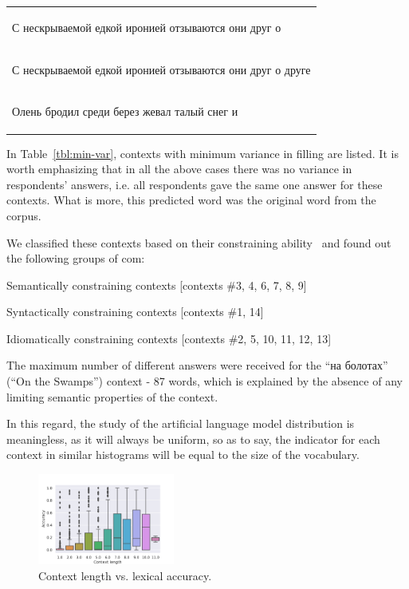\documentclass[a4paper]{article}
\begin{document}
\begin{table}
\begin{tabular}{l}
\begin{russian} С нескрываемой едкой иронией отзываются они друг о\end{russian} \\
\begin{russian} С нескрываемой едкой иронией отзываются они друг о друге\end{russian} \\
\begin{russian} Олень бродил среди берез жевал талый снег и\end{russian} \\
\end{tabular}
\end{table}

In Table~\ref{tbl:min-var}, contexts with minimum variance in filling
are listed. It is worth emphasizing that in all the above cases there
was no variance in respondents’ answers, i.e. all respondents gave the
same one answer for these contexts. What is more, this predicted word
was the original word from the corpus.

We classified these contexts based on their constraining ability
 and found out the following groups of com:

Semantically constraining contexts [contexts \#3, 4, 6, 7, 8, 9]

Syntactically constraining contexts [contexts \#1, 14]

Idiomatically constraining contexts [contexts \#2, 5, 10, 11, 12, 13]

The maximum number of different answers were received for the “на болотах” (“On the Swamps”) context - 87 words, which is explained by the absence of any limiting semantic properties of the context.

In this regard, the study of the artificial language model distribution is meaningless, as it will always be uniform, so as to say, the indicator for each context in similar histograms will be equal to the size of the vocabulary.

\begin{figure}
\caption{Context length vs. lexical accuracy.}
\centering

\includegraphics[width=0.4\textwidth]{figures/pdf/context-accuracy-lexical.pdf}

\end{figure}
\end{document}
